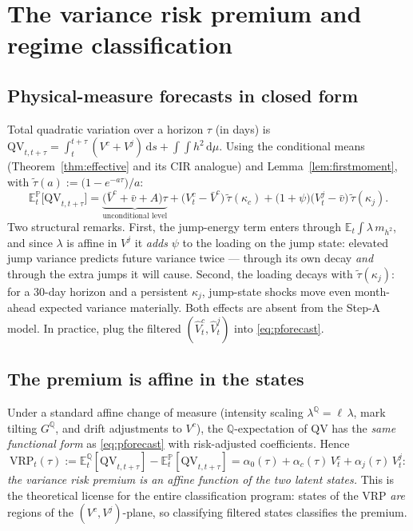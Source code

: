 \documentclass[11pt]{report}
\theoremstyle{definition}
\theoremstyle{remark}
\newcommand{\E}{\mathbb{E}}
\newcommand{\dd}{\,\mathrm{d}}
\newcommand{\Vc}{V^{c}}
\newcommand{\Vj}{V^{j}}
\newcommand{\QV}{\mathrm{QV}}
\newcommand{\mh}{m_{h^{2}}}
\begin{document}
\chapter{The variance risk premium and regime classification}
\label{ch:vrp}

\section{Physical-measure forecasts in closed form}

Total quadratic variation over a horizon $\tau$ (in days) is
$\QV_{t,t+\tau}=\int_{t}^{t+\tau}(\Vc+\Vj)\dd s+\int\!\!\int h^{2}\dd\mu$.
Using the conditional means (Theorem~\ref{thm:effective} and its CIR
analogue) and Lemma~\ref{lem:firstmoment}, with
$\tilde\tau(a):=\big(1-e^{-a\tau}\big)/a$:
\begin{equation}\label{eq:pforecast}
\boxed{\;
\E^{\mathbb{P}}_{t}\big[\QV_{t,t+\tau}\big]
=\underbrace{\big(\bar V^{c}+\bar v+A\big)\tau}_{\text{unconditional level}}
+\big(\Vc_{t}-\bar V^{c}\big)\,\tilde\tau(\kappa_{c})
+\big(1+\psi\big)\big(\Vj_{t}-\bar v\big)\,\tilde\tau(\kappa_{j}) . \;}
\end{equation}
Two structural remarks. First, the jump-energy term enters through
$\E_{t}\int\lambda\,\mh$, and since $\lambda$ is affine in $\Vj$ it
\emph{adds} $\psi$ to the loading on the jump state: elevated jump variance
predicts future variance twice --- through its own decay \emph{and} through
the extra jumps it will cause. Second, the loading decays with
$\tilde\tau(\kappa_{j})$: for a 30-day horizon and a persistent
$\kappa_{j}$, jump-state shocks move even month-ahead expected variance
materially. Both effects are absent from the Step-A model. In practice,
plug the filtered $(\hat\Vc_{t},\hat\Vj_{t})$ into \eqref{eq:pforecast}.

\section{The premium is affine in the states}

Under a standard affine change of measure (intensity scaling
$\lambda^{\mathbb{Q}}=\ell\,\lambda$, mark tilting
$G^{\mathbb{Q}}$, and drift adjustments to $\Vc$), the
$\mathbb{Q}$-expectation of $\QV$ has the \emph{same functional form} as
\eqref{eq:pforecast} with risk-adjusted coefficients. Hence
\begin{equation}\label{eq:vrpaffine}
\mathrm{VRP}_{t}(\tau)
:=\E^{\mathbb{Q}}_{t}[\QV_{t,t+\tau}]-\E^{\mathbb{P}}_{t}[\QV_{t,t+\tau}]
=\alpha_{0}(\tau)+\alpha_{c}(\tau)\,\Vc_{t}+\alpha_{j}(\tau)\,\Vj_{t} :
\end{equation}
\emph{the variance risk premium is an affine function of the two latent
states.} This is the theoretical license for the entire classification
program: states of the VRP \emph{are} regions of the
$(\Vc,\Vj)$-plane, so classifying filtered states classifies the premium.
\end{document}
